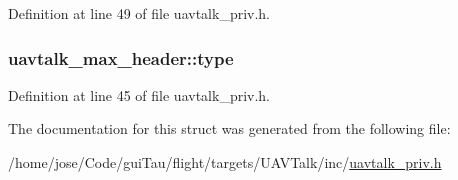 Definition at line 49 of file uavtalk\-\_\-priv.\-h.

\hypertarget{structuavtalk__max__header_a5b36790b1ee1944fe8d335b817e5f424}{
\subsubsection[{type}]{ uavtalk\-\_\-max\-\_\-header\-::type}}\label{structuavtalk__max__header_a5b36790b1ee1944fe8d335b817e5f424}


Definition at line 45 of file uavtalk\-\_\-priv.\-h.



The documentation for this struct was generated from the following file\-:\begin{DoxyCompactItemize}
\item 
/home/jose/\-Code/gui\-Tau/flight/targets/\-U\-A\-V\-Talk/inc/\hyperlink{uavtalk__priv_8h}{uavtalk\-\_\-priv.\-h}\end{DoxyCompactItemize}
